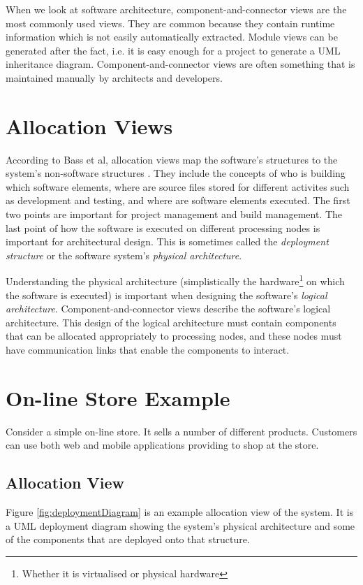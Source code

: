 When we look at software architecture, component-and-connector views are the most commonly used views.
They are common because they contain runtime information which is not easily automatically extracted.
Module views can be generated after the fact, i.e. it is easy enough for a project to generate a UML inheritance diagram.
Component-and-connector views are often something that is maintained manually by architects and developers.

\section{Allocation Views}
According to Bass et al, allocation views map the software's structures to the system's non-software structures \cite{bass2021software}.
They include the concepts of who is building which software elements,
where are source files stored for different activites such as development and testing,
and where are software elements executed.
The first two points are important for project management and build management.
The last point of how the software is executed on different processing nodes is important for architectural design.
This is sometimes called the \emph{deployment structure} or the software system's \emph{physical architecture}.

Understanding the physical architecture (simplistically the hardware\footnote{Whether it is virtualised or physical hardware}
on which the software is executed) is important when designing the software's \emph{logical architecture}.
Component-and-connector views describe the software's logical architecture.
This design of the logical architecture must contain components that can be allocated appropriately to processing nodes,
and these nodes must have communication links that enable the components to interact.

\section{On-line Store Example}
Consider a simple on-line store. It sells a number of different products. Customers can use both web and mobile applications providing to shop at the store.

\subsection{Allocation View}
Figure \ref{fig:deploymentDiagram} is an example allocation view of the system.
It is a UML deployment diagram showing the system's physical architecture
and some of the components that are deployed onto that structure.

